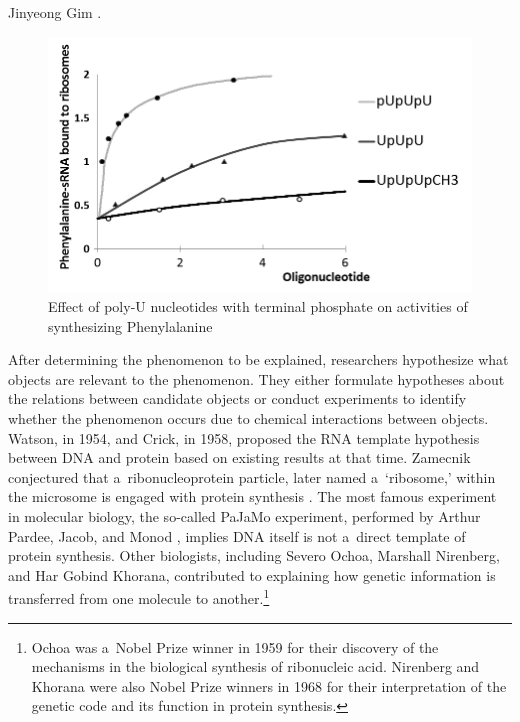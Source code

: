 \begin{artengenv}{Jinyeong Gim}
{ \parencite[for more details see][]{jacob_genetic_1961}.}
 
\begin{figure}[H]
 \begin{center}
 \includegraphics[width=.8\textwidth]{ART_Gim/fig.4_polyU_new_bw.png}%
 \end{center}%
 \caption{Effect of poly-U nucleotides with terminal phosphate on activities of synthesizing Phenylalanine
 \parencite[based on][p.562]{rottman_rna_1966}}\label{gim.fig4}
\end{figure}


After determining the phenomenon to be explained, researchers hypothesize what objects are relevant to the phenomenon. They either formulate hypotheses about the relations between candidate objects or conduct experiments to identify whether the phenomenon occurs due to chemical interactions between objects. Watson, in 1954, and Crick, in 1958, proposed the RNA template hypothesis between DNA and protein based on existing results at that time. Zamecnik conjectured that a~ribonucleoprotein particle, later named a~‘ribosome,' within the microsome is engaged with protein synthesis
\parencite[][]{hoagland_soluble_1958}. %
 The most famous experiment in molecular biology, the so-called PaJaMo experiment, performed by Arthur Pardee, Jacob, and Monod 
\parencite*[][]{pardee_genetic_1959}, %
 implies DNA itself is not a~direct template of protein synthesis. Other biologists, including Severo Ochoa, Marshall Nirenberg, and Har Gobind Khorana, contributed to explaining how genetic information is transferred from one molecule to another.\footnote{Ochoa was a~Nobel Prize winner in 1959 for their discovery of the mechanisms in the biological synthesis of ribonucleic acid. Nirenberg and Khorana were also Nobel Prize winners in 1968 for their interpretation of the genetic code and its function in protein synthesis.}


\end{artengenv}
